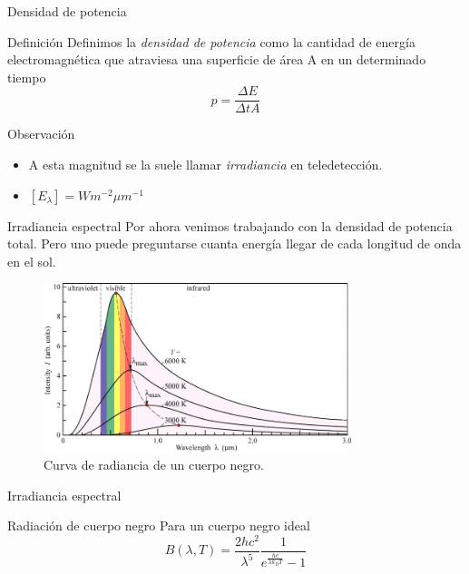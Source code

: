 \documentclass[handout]{beamer}
\begin{document}
\begin{frame}{Densidad de potencia}
  \begin{block}{Definición}
    Definimos la \emph{densidad de potencia} como la cantidad de energía electromagnética que atraviesa una superficie de área A en un determinado tiempo
    \begin{equation}
      p = \frac{\Delta E}{\Delta t A}
    \end{equation}
  \end{block}\pause
  \begin{block}{Observación}
  \begin{itemize}[<+->]
    \item A esta magnitud se la suele llamar \emph{irradiancia} en teledetección.
    \item $[E_\lambda] = W m^{-2} \mu m^{-1}$
  \end{itemize}
  \end{block}
\end{frame}

\begin{frame}{Irradiancia espectral}
  Por ahora venimos trabajando con la densidad de potencia total. Pero uno puede preguntarse cuanta energía llegar de cada longitud de onda en el sol.
  \begin{figure}
    \includegraphics[width=0.8\textwidth]{imagenes/black-body-radiation-curves.png}
    \caption{Curva de radiancia de un cuerpo negro.}
  \end{figure}
\end{frame}

\begin{frame}{Irradiancia espectral}
  \begin{block}{Radiación de cuerpo negro}
    Para un cuerpo negro ideal
    \begin{equation}
      B(\lambda,T) = \frac{2hc^2}{\lambda^5}\frac{1}{e^{\frac{hc}{\lambda k_B T}}-1}
    \end{equation}
  \end{block}
\end{frame}
\end{document}
